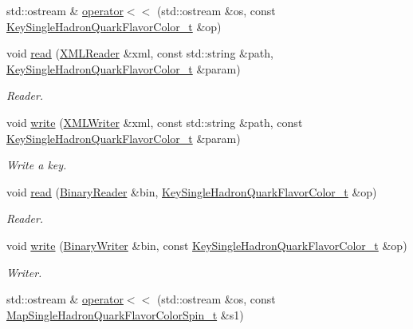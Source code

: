 \begin{DoxyCompactItemize}
std\+::ostream \& \mbox{\hyperlink{namespaceHadron_ac39a55fe17a7ba63e515041398ff55e4}{operator$<$$<$}} (std\+::ostream \&os, const \mbox{\hyperlink{structHadron_1_1KeySingleHadronQuarkFlavorColor__t}{Key\+Single\+Hadron\+Quark\+Flavor\+Color\+\_\+t}} \&op)
\item 
void \mbox{\hyperlink{namespaceHadron_a3b1ec7d213815eedf06fcd0e518eb5d3}{read}} (\mbox{\hyperlink{classADATXML_1_1XMLReader}{X\+M\+L\+Reader}} \&xml, const std\+::string \&path, \mbox{\hyperlink{structHadron_1_1KeySingleHadronQuarkFlavorColor__t}{Key\+Single\+Hadron\+Quark\+Flavor\+Color\+\_\+t}} \&param)
\begin{DoxyCompactList}\small\item\em Reader. \end{DoxyCompactList}\item 
void \mbox{\hyperlink{namespaceHadron_a64d17f6dc5e4987b14cc4a2d33401b7c}{write}} (\mbox{\hyperlink{classADATXML_1_1XMLWriter}{X\+M\+L\+Writer}} \&xml, const std\+::string \&path, const \mbox{\hyperlink{structHadron_1_1KeySingleHadronQuarkFlavorColor__t}{Key\+Single\+Hadron\+Quark\+Flavor\+Color\+\_\+t}} \&param)
\begin{DoxyCompactList}\small\item\em Write a key. \end{DoxyCompactList}\item 
void \mbox{\hyperlink{namespaceHadron_afc23e5e61669cc277e94a613ee812b0f}{read}} (\mbox{\hyperlink{classADATIO_1_1BinaryReader}{Binary\+Reader}} \&bin, \mbox{\hyperlink{structHadron_1_1KeySingleHadronQuarkFlavorColor__t}{Key\+Single\+Hadron\+Quark\+Flavor\+Color\+\_\+t}} \&op)
\begin{DoxyCompactList}\small\item\em Reader. \end{DoxyCompactList}\item 
void \mbox{\hyperlink{namespaceHadron_a36eb0d304eb3644075b1598cde742d87}{write}} (\mbox{\hyperlink{classADATIO_1_1BinaryWriter}{Binary\+Writer}} \&bin, const \mbox{\hyperlink{structHadron_1_1KeySingleHadronQuarkFlavorColor__t}{Key\+Single\+Hadron\+Quark\+Flavor\+Color\+\_\+t}} \&op)
\begin{DoxyCompactList}\small\item\em Writer. \end{DoxyCompactList}\item 
std\+::ostream \& \mbox{\hyperlink{namespaceHadron_aa68c7efacb8bc21a4d87aede8544def5}{operator$<$$<$}} (std\+::ostream \&os, const \mbox{\hyperlink{namespaceHadron_a03b319764f85c20434f20a269ce5f388}{Map\+Single\+Hadron\+Quark\+Flavor\+Color\+Spin\+\_\+t}} \&s1)

\end{DoxyCompactItemize}
